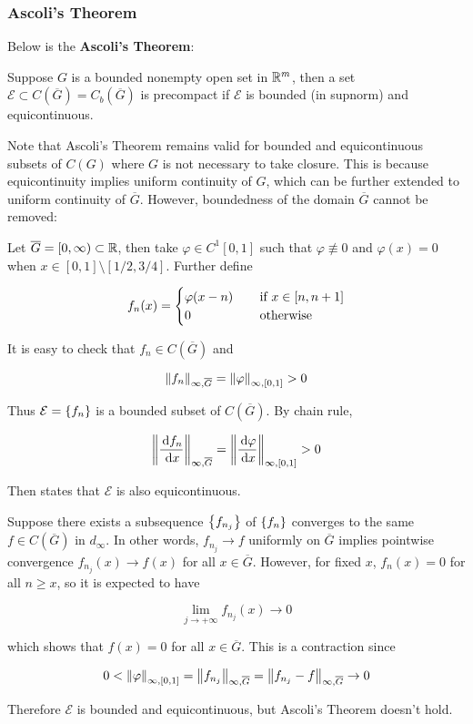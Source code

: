 \documentclass[a4paper,12pt]{article}
\begin{document}
\subsubsection{Ascoli's Theorem}
Below is the \textbf{Ascoli's Theorem}:\n

\begin{thm}
  Suppose $G$ is a bounded nonempty open set in $\mathbb{R}^{m}$, then a set $\mathcal{E}\subset C(\overline{G})=C_{b}(\overline{G})$ is precompact if $\mathcal{E}$ is bounded (in supnorm) and equicontinuous.
\end{thm}\n

Note that Ascoli's Theorem remains valid for bounded and equicontinuous subsets of $C(G)$ where $G$ is not necessary to take closure. This is because equicontinuity implies uniform continuity of $G$, which can be further extended to uniform continuity of $\overline{G}$. However, boundedness of the domain $\overline{G}$ cannot be removed:\n

\begin{exm}
  Let $\overline{G}=[0,\infty)\subset\mathbb{R}$, then take $\varphi\in C^{1}[0,1]$ such that $\varphi\not\equiv 0$ and $\varphi(x)=0$ when $x\in[0,1]\setminus[1/2,3/4]$. Further define

  $$f_{n}(x)=\begin{cases}
    \varphi(x-n)&\;\;\;\;\text{if }x\in[n,n+1]\\
    0&\;\;\;\;\text{otherwise}
  \end{cases}$$\s

  It is easy to check that $f_{n}\in C(\overline{G})$ and

  $$\left\| f_{n}\right\|_{\infty,\overline{G}}=\left\| \varphi\right\|_{\infty,[0,1]}>0$$\s

  Thus $\mathcal{E}=\left\{ f_{n}\right\}$ is a bounded subset of $C(\overline{G})$. By chain rule,

  $$\left\| \frac{\,\mathrm{d} f_{n}}{\,\mathrm{d} x}\right\|_{\infty,\overline{G}}=\left\| \frac{\,\mathrm{d}\varphi}{\,\mathrm{d} x}\right\|_{\infty,[0,1]}>0$$\s

  Then \rpst[\sctr{3}] states that $\mathcal{E}$ is also equicontinuous.\n
  
  Suppose there exists a subsequence $\left\{ f_{n_{j}}\right\}$ of $\left\{ f_{n}\right\}$ converges to the same $f\in C(\overline{G})$ in $d_{\infty}$. In other words, $f_{n_{j}}\to f$ uniformly on $\overline{G}$ implies pointwise convergence $f_{n_{j}}(x)\to f(x)$ for all $x\in\overline{G}$. However, for fixed $x$, $f_{n}(x)=0$ for all $n\geq x$, so it is expected to have

  $$\lim_{j\to+\infty}f_{n_{j}}(x)\to 0$$\s

  which shows that $f(x)=0$ for all $x\in\overline{G}$. This is a contraction since

  $$0<\left\| \varphi\right\|_{\infty,[0,1]}=\left\| f_{n_{j}}\right\|_{\infty,\overline{G}}=\left\| f_{n_{j}}-f\right\|_{\infty,\overline{G}}\to 0$$\s

  Therefore $\mathcal{E}$ is bounded and equicontinuous, but Ascoli's Theorem doesn't hold.
\end{exm}
\end{document}
